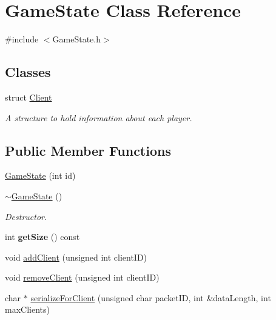 \hypertarget{class_game_state}{\section{Game\-State Class Reference}
\label{class_game_state}
}


{\ttfamily \#include $<$Game\-State.\-h$>$}

\subsection*{Classes}
\begin{DoxyCompactItemize}
\item 
struct \hyperlink{struct_game_state_1_1_client}{Client}
\begin{DoxyCompactList}\small\item\em A structure to hold information about each player. \end{DoxyCompactList}\end{DoxyCompactItemize}
\subsection*{Public Member Functions}
\begin{DoxyCompactItemize}
\item 
\hyperlink{class_game_state_a74a35fb7045c0eee7e68f07c387e2ddf}{Game\-State} (int id)
\item 
\hypertarget{class_game_state_ae623df5042cd0c17daa3394fdcb397b3}{\hyperlink{class_game_state_ae623df5042cd0c17daa3394fdcb397b3}{$\sim$\-Game\-State} ()}\label{class_game_state_ae623df5042cd0c17daa3394fdcb397b3}

\begin{DoxyCompactList}\small\item\em Destructor. \end{DoxyCompactList}\item 
\hypertarget{class_game_state_ad1a31927652ff2e0f8584527cc90ce24}{int {\bfseries get\-Size} () const }\label{class_game_state_ad1a31927652ff2e0f8584527cc90ce24}

\item 
void \hyperlink{class_game_state_ac4d3a12e4ac6849da587da41ae970083}{add\-Client} (unsigned int client\-I\-D)
\item 
void \hyperlink{class_game_state_ae368d794e1e2b700901531d0702e980c}{remove\-Client} (unsigned int client\-I\-D)
\item 
char $\ast$ \hyperlink{class_game_state_ab6a18ea584fef4c1fafb8f621c912ca3}{serialize\-For\-Client} (unsigned char packet\-I\-D, int \&data\-Length, int max\-Clients)
\end{DoxyCompactItemize}

